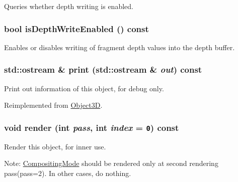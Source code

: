 Queries whether depth writing is enabled. \hypertarget{classm3g_1_1CompositingMode_0ee4c812abd4a99e0373158d36dc45d9}{
\subsubsection[{isDepthWriteEnabled}]{\setlength{\rightskip}{0pt plus 5cm}bool isDepthWriteEnabled () const}}
\label{classm3g_1_1CompositingMode_0ee4c812abd4a99e0373158d36dc45d9}


Enables or disables writing of fragment depth values into the depth buffer. \hypertarget{classm3g_1_1CompositingMode_6fea17fa1532df3794f8cb39cb4f911f}{
\subsubsection[{print}]{\setlength{\rightskip}{0pt plus 5cm}std::ostream \& print (std::ostream \& {\em out}) const}}
\label{classm3g_1_1CompositingMode_6fea17fa1532df3794f8cb39cb4f911f}


Print out information of this object, for debug only. 

Reimplemented from \hyperlink{classm3g_1_1Object3D_6fea17fa1532df3794f8cb39cb4f911f}{Object3D}.\hypertarget{classm3g_1_1CompositingMode_1efcb1973989d9963d5bd6d03065d389}{
\subsubsection[{render}]{\setlength{\rightskip}{0pt plus 5cm}void render (int {\em pass}, \/  int {\em index} = {\tt 0}) const}}
\label{classm3g_1_1CompositingMode_1efcb1973989d9963d5bd6d03065d389}


Render this object, for inner use.

Note: \hyperlink{classm3g_1_1CompositingMode}{CompositingMode} should be rendered only at second rendering pass(pass=2). In other cases, do nothing. 


